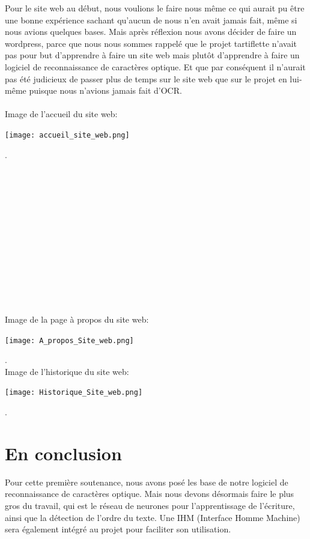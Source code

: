 \documentclass [french,12pt]{article}
\begin{document}
Pour le site web au début, nous voulions le faire nous même ce qui aurait pu être une bonne expérience sachant qu’aucun de nous n’en avait jamais fait, même si nous avions quelques bases. Mais après réflexion nous avons décider de faire un wordpress, parce que nous nous sommes rappelé que le projet tartiflette n’avait pas pour but d’apprendre à faire un site web mais plutôt d’apprendre à faire un logiciel de reconnaissance de caractères optique. Et que par conséquent il n’aurait pas été judicieux de passer plus de temps sur le site web que sur le projet en lui-même puisque nous n'avions jamais fait d'OCR.
\\
\\
Image de l'accueil du site web:
\\
\begin{center} \texttt{[image: accueil\_site\_web.png]} \end{center}.
\\
\\
\\
\\
\\
\\
\\
\\
\\
\\
\\
\\
\\
\\
Image de la page à propos du site web:
\\
\begin{center} \texttt{[image: A\_propos\_Site\_web.png]} \end{center}.
\\
Image de l'historique du site web:
\\
\begin{center} \texttt{[image: Historique\_Site\_web.png]} \end{center}.
\\
\section{En conclusion}

Pour cette première soutenance, nous avons posé les base de notre logiciel de reconnaissance de caractères optique. Mais nous devons désormais faire le plus gros du travail, qui est le réseau de neurones pour l’apprentissage de l’écriture, ainsi que la détection de l’ordre du texte. Une IHM (Interface Homme Machine) sera également intégré au projet pour faciliter son utilisation.
\end{document}
